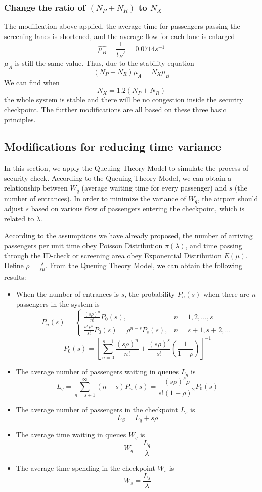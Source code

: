 \documentclass{mcmthesis}
\begin{document}
\subsubsection{Change the ratio of $(N_P+N_R)$ to $N_X$}
The modification above applied, the average time for passengers passing the screening-lanes is shortened, and the average flow for each lane is enlarged
$$\widehat{\mu_B}=\frac{1}{\overline{t_B}'}=0.0714s^{-1}$$
$\mu_A$ is still the same value. Thus, due to the stability equation
$$(N_P+N_R)\mu_A=N_X\mu_B$$
We can find when
$$N_X=1.2(N_P+N_R)$$
the whole system is stable and there will be no congestion inside the security checkpoint.
The further modifications are all based on these three basic principles.
\subsection{Modifications for reducing time variance}
In this section, we apply the Queuing Theory Model to simulate the process of security check. According to the Queuing Theory Model, we can obtain a relationship between $W_q$ (average waiting time for every passenger) and $s$ (the number of entrances). In order to minimize the variance of $W_q$, the airport should adjust $s$ based on various flow of passengers entering the checkpoint, which is related to $\lambda$.

According to the assumptions we have already proposed, the number of arriving passengers per unit time obey Poisson Distribution $\pi(\lambda)$, and time passing through the ID-check or screening area obey Exponential Distribution $E(\mu)$. Define $\rho=\frac{\lambda}{s\mu}$. From the Queuing Theory Model, we can obtain the following results:

\begin{itemize}
\item When the number of entrances is $s$, the probability $P_n(s)$ when there are $n$ passengers in the system  is
\begin{equation}
    P_n(s)=
   \begin{cases}
   \frac{(s\rho)^n}{n!}P_0(s), &\mbox{$n=1,2,\ldots,s$}\\
   \frac{s^s\rho^n}{s!}P_0(s)=\rho^{n-s}P_s(s), &\mbox{$n=s+1,s+2,\ldots$}
   \end{cases}
\end{equation}
$$P_0(s)=[\sum_{n=0}^{s-1}\frac{(s\rho)^n}{n!}+\frac{(s\rho)^s}{s!}(\frac{1}{1-\rho})]^{-1}$$
\item The average number of passengers waiting in queues $L_q$ is
$$L_q=\sum_{n=s+1}^{\infty}(n-s)P_n(s)=\frac{(s\rho)^s\rho}{s!(1-\rho)^2}P_0(s)$$
\item The average number of passengers in the checkpoint $L_s$ is 
$$L_S=L_q+s\rho$$
\item The average time waiting in queues $W_q$ is
$$W_q=\frac{L_q}{\lambda}$$
\item The average time spending in the checkpoint $W_s$ is
$$W_s=\frac{L_s}{\lambda}$$
\end{itemize}
\end{document}
